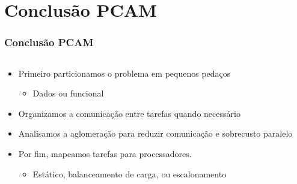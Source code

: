 \documentclass[xcolor={usenames,dvipsnames},12pt,presentation,aspectratio=169]{beamer}
\begin{document}
\section{Conclusão PCAM}
\begin{frame}
  \frametitle{Conclusão PCAM}
  \vspace{-3mm}
   \begin{columns}
     \begin{column}{0.6\textwidth}
      \begin{itemize}
        \item Primeiro particionamos o problema em pequenos pedaços
        \begin{itemize}
          \item Dados ou funcional
        \end{itemize}
        \item Organizamos a comunicação entre tarefas quando necessário
        \item Analisamos a aglomeração para reduzir comunicação e sobrecusto paralelo
        \item Por fim, mapeamos tarefas para processadores.
        \begin{itemize}
          \item Estático, balanceamento de carga, ou escalonamento
        \end{itemize}
      \end{itemize}
     \end{column}
     \begin{column}{0.4\textwidth}
        \begin{center}

\end{center}
\end{column}
\end{columns}
\end{frame}
\end{document}
